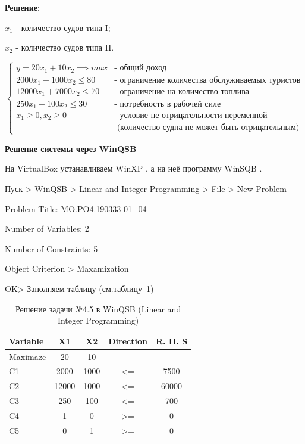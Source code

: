 \textbf{Решение}:

$x_1$ - количество судов типа I;

$x_2$ - количество судов типа II.

$$
\begin{cases}
  y = 20 x_1 + 10 x_2 \implies max &\text{- общий доход}\\
  2000 x_1 + 1000 x_2 \leq 80 &\text{- ограничение количества обслуживаемых туристов}\\
  12000 x_1 + 7000 x_2 \leq 70 &\text{- ограничение на количество топлива}\\
  250 x_1 + 100 x_2 \leq 30 &\text{- потребность в рабочей силе}\\
  x_1 \geq 0, x_2 \geq 0 &\text{- условие не отрицательности переменной}\\
  &\text{  (количество судна не может быть отрицательным)}
\end{cases}
$$

\begin{center}
  \textbf{Решение системы через WinQSB}
\end{center}

На VirtualBox \cite{VirtualBox} устанавливаем WinXP \cite{WinXP}, а на неё программу WinSQB \cite{WinQSB}.

Пуск > WinQSB > Linear and Integer Programming > File > New Problem

Problem Title: MO.PO4.190333-01\_04

Number of Variables: 2

Number of Constraints: 5

Object Criterion > Maxamization

OK> Заполняем таблицу (см.таблицу~\ref{tab:4_5})

\begin{table}[h!]

  \centering

  \caption{Решение задачи №4.5 в WinQSB (Linear and Integer Programming)}
  \label{tab:4_5}

  \begin{tabular}{ |l||c|c|c|c| } 
    \hline
    Variable & X1 & X2 & Direction & R. H. S \\ \hline
    \hline
    Maximaze & 20 & 10 &  & \\ \hline
    C1 & 2000 & 1000 & <= & 7500 \\ \hline
    C2 & 12000 & 1000 & <= & 60000 \\ \hline
    C3 & 250 & 100 & <= & 700 \\ \hline
    C4 & 1 & 0 & >= & 0 \\ \hline
    C5 & 0 & 1 & >= & 0 \\ \hline
  \end{tabular}
\end{table}

